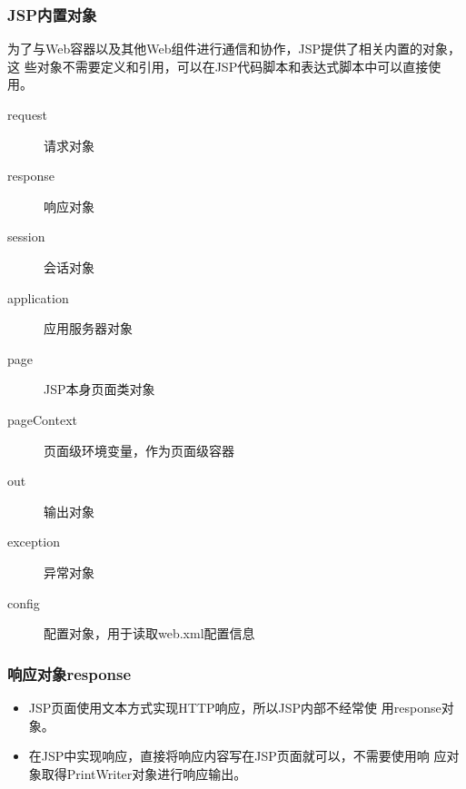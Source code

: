 \begin{frame}[fragile] %
  \frametitle{JSP内置对象} 

  为了与Web容器以及其他Web组件进行通信和协作，JSP提供了相关内置的对象，这
  些对象不需要定义和引用，可以在JSP代码脚本和表达式脚本中可以直接使用。

  \begin{description}
  \item[request] 请求对象
  \item[response] 响应对象
  \item[session] 会话对象
  \item[application] 应用服务器对象
  \item[page] JSP本身页面类对象
  \item[pageContext] 页面级环境变量，作为页面级容器
  \item[out] 输出对象
  \item[exception] 异常对象
  \item[config] 配置对象，用于读取web.xml配置信息
  \end{description}

\end{frame}


\begin{frame}[fragile] %
  \frametitle{响应对象response} 

  \begin{itemize}
  \item JSP页面使用文本方式实现HTTP响应，所以JSP内部不经常使
    用response对象。
  \item 在JSP中实现响应，直接将响应内容写在JSP页面就可以，不需要使用响
    应对象取得PrintWriter对象进行响应输出。
\end{itemize}

\end{frame}

